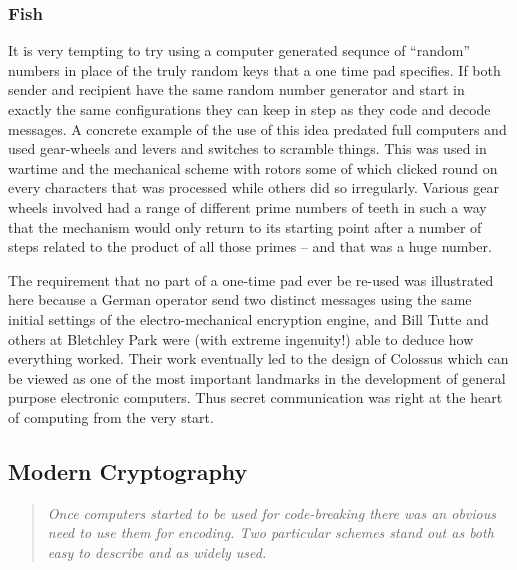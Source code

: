 \subsubsection{Fish}
It is very tempting to try using a computer generated sequnce of ``random'' numbers
in place of the truly random keys that a one time pad specifies. If both sender and
recipient have the same random number generator and start in exactly the
same configurations they can keep in step as they code and decode messages.
A concrete example of the use of this idea predated full computers and used
gear-wheels and levers and switches to scramble things. This was used in wartime
and the mechanical scheme with rotors some of which clicked round on every
characters that was processed while others did so irregularly. Various gear
wheels involved had a range of different prime numbers of teeth in such a way
that the mechanism would only return to its starting point after a number of
steps related to the product of all those primes -- and that was a huge number.

The requirement that no part of a one-time pad ever be re-used was illustrated
here because a German operator send two distinct messages using the same
initial settings of the electro-mechanical encryption engine, and Bill Tutte
and others at Bletchley Park were (with extreme ingenuity!) able to deduce
how everything worked\cite{https://www.tnmoc.org/tunny-heath-robinson}.
Their work eventually led to the design of Colossus which can be viewed as one
of the most important landmarks in the development of general purpose electronic
computers. Thus secret communication was right at the heart of computing from
the very start.

\subsection{Modern Cryptography}
\begin{quotation}\textit{
Once computers started to be used for code-breaking there was an
obvious need to use them for encoding. Two particular schemes stand out
as both easy to describe and as widely used.
}\end{quotation}
